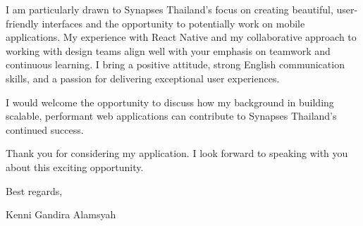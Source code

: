 \documentclass[11pt]{article}
\begin{document}
\vspace{0.3cm}

I am particularly drawn to Synapses Thailand's focus on creating beautiful, user-friendly interfaces and the opportunity to potentially work on mobile applications. My experience with React Native and my collaborative approach to working with design teams align well with your emphasis on teamwork and continuous learning. I bring a positive attitude, strong English communication skills, and a passion for delivering exceptional user experiences.

\vspace{0.3cm}

I would welcome the opportunity to discuss how my background in building scalable, performant web applications can contribute to Synapses Thailand's continued success.

\vspace{0.3cm}

Thank you for considering my application. I look forward to speaking with you about this exciting opportunity.

\vspace{0.5cm}

\noindent
Best regards,

\vspace{0.3cm}

\noindent
Kenni Gandira Alamsyah
\end{document}
